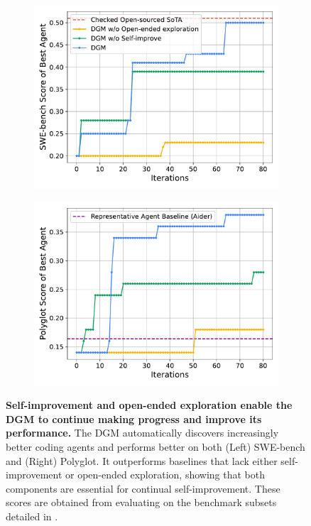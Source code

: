 \documentclass{article}
\begin{document}
\begin{figure}[ht]
    \centering
    \begin{subfigure}[t]{0.48\textwidth}
        \centering
        \includegraphics[width=\textwidth]{figures/dgm_comparisons.pdf}
        \label{fig:dgm-comparisons-swe}
    \end{subfigure}
    \hfill
    \begin{subfigure}[t]{0.48\textwidth}
        \centering
        \includegraphics[width=\textwidth]{figures/dgm_comparisons_polyglot.pdf}
        \label{fig:dgm-comparisons-polyglot}
    \end{subfigure}
    \vspace{-15pt}
    \caption{\textbf{Self-improvement and open-ended exploration enable the DGM to continue making progress and improve its performance.} The DGM automatically discovers increasingly better coding agents and performs better on both (Left) SWE-bench and (Right) Polyglot. It outperforms baselines that lack either self-improvement or open-ended exploration, showing that both components are essential for continual self-improvement. These scores are obtained from evaluating on the benchmark subsets detailed in .}
    \label{fig:dgm-comparisons}
\end{figure}
\end{document}
